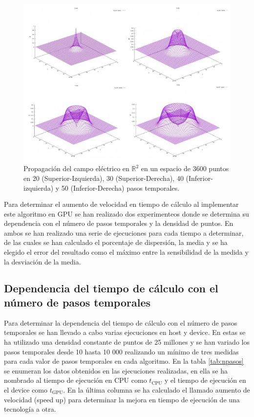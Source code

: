 \documentclass[11pt,a4paper,twoside,pdf]{article}
\numberwithin{equation}{section}
\begin{document}
\begin{figure}[ht]
\centering
\includegraphics[width=15 cm]{Solution.JPG}				
\caption{Propagación del campo eléctrico en $\mathbb R^{2}$ en un espacio de 3600 puntos en 20 (Superior-Izquierda), 30 (Superior-Derecha), 40 (Inferior-izquierda) y 50 (Inferior-Derecha) pasos temporales.}
\label{fig:solucion}
\end{figure}
\noindent

Para determinar el aumento de velocidad en tiempo de cálculo al implementar este algoritmo en GPU se han realizado dos experimenteos donde se determina su dependencia con el número de pasos temporales y la densidad de puntos. En ambos se han realizado una serie de ejecuciones para cada tiempo a determinar, de las cuales se han calculado el porcentaje de dispersión, la media y se ha elegido el error del resultado como el máximo entre la sensibilidad de la medida y la desviación de la media.

\subsection{Dependencia del tiempo de cálculo con el número de pasos temporales} \label{Subsection:Variacion pasos temporales}

Para determinar la dependencia del tiempo de cálculo con el número de pasos temporales se han llevado a cabo varias ejecuciones en host y device. En estas se ha utilizado una densidad constante de puntos de 25 millones y se han variado los pasos temporales desde 10 hasta 10 000 realizando un mínimo de tres medidas para cada valor de pasos temporales en cada algoritmo. En la tabla  \ref{tab:npasos} se enumeran los datos obtenidos en las ejecuciones realizadas, en ella se ha nombrado al tiempo de ejecución en CPU como $t_\text{CPU}$ y el tiempo de ejecución en el device como $t_\text{GPU}$. En la última columna se ha calculado el llamado aumento de velocidad (speed up) para determinar la mejora en tiempo de ejecución de una tecnología a otra.
\end{document}
